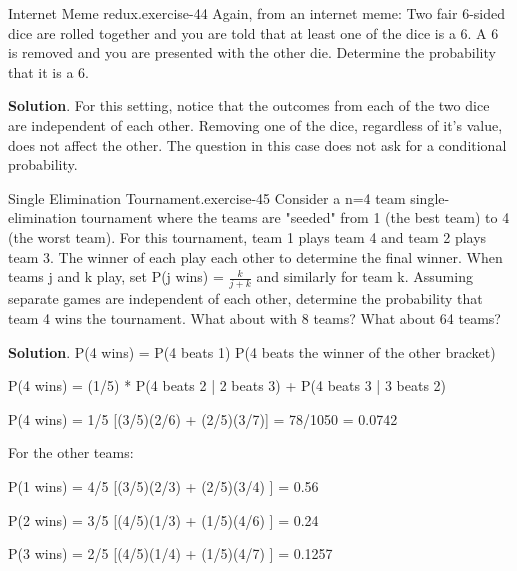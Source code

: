 \documentclass[10pt,]{book}
\numberwithin{equation}{section}
\begin{document}
%
\par
\hypertarget{p-635}{}%
\begin{inlineexercise}{Internet Meme redux.}{exercise-44}%
\hypertarget{p-636}{}%
Again, from an internet meme:  Two fair 6-sided dice are rolled together and you are told that at least one of the dice is a 6. A 6 is removed and you are presented with the other die.  Determine the probability that it is a 6.%
\par\smallskip%
\noindent\textbf{Solution}.\hypertarget{solution-21}{}\quad%
\hypertarget{p-637}{}%
For this setting, notice that the outcomes from each of the two dice are independent of each other. Removing one of the dice, regardless of it's value, does not affect the other. The question in this case does not ask for a conditional probability.%
\end{inlineexercise}
%
\par
\hypertarget{p-638}{}%
\begin{inlineexercise}{Single Elimination Tournament.}{exercise-45}%
\hypertarget{p-639}{}%
Consider a n=4 team single-elimination tournament where the teams are "seeded" from 1 (the best team) to 4 (the worst team).  For this tournament, team 1 plays team 4 and team 2 plays team 3. The winner of each play each other to determine the final winner. When teams j and k play, set P(j wins) = \(\frac{k}{j+k}\) and similarly for team k.  Assuming separate games are independent of each other, determine the probability that team 4 wins the tournament. What about with 8 teams? What about 64 teams?%
\par\smallskip%
\noindent\textbf{Solution}.\hypertarget{solution-22}{}\quad%
\hypertarget{p-640}{}%
P(4 wins) = P(4 beats 1) P(4 beats the winner of the other bracket)%
\par
\hypertarget{p-641}{}%
P(4 wins) = (1/5) * P(4 beats 2 | 2 beats 3) + P(4 beats 3 | 3 beats 2)%
\par
\hypertarget{p-642}{}%
P(4 wins) = 1/5 [(3/5)(2/6) + (2/5)(3/7)] = 78/1050 = 0.0742%
\par
\hypertarget{p-643}{}%
For the other teams:%
\par
\hypertarget{p-644}{}%
P(1 wins) = 4/5 [(3/5)(2/3) + (2/5)(3/4) ] = 0.56%
\par
\hypertarget{p-645}{}%
P(2 wins) = 3/5 [(4/5)(1/3) + (1/5)(4/6) ] = 0.24%
\par
\hypertarget{p-646}{}%
P(3 wins) = 2/5 [(4/5)(1/4) + (1/5)(4/7) ] = 0.1257%
\end{inlineexercise}
%
%
%
\typeout{************************************************}
\typeout{************************************************}
%
\end{document}
